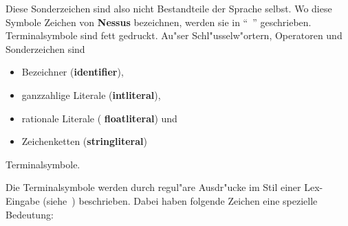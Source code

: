 Diese Sonderzeichen sind also nicht Bestandteile der Sprache selbst.
Wo diese Symbole Zeichen von {\bf Nessus} bezeichnen, werden sie in
``~'' geschrieben.  Terminalsymbole sind fett gedruckt. Au"ser
Schl"usselw"ortern, Operatoren und Sonderzeichen sind

\begin{itemize}
  
\item Bezeichner ({\bf identifier}),
  
\item ganzzahlige
Literale ({\bf intliteral}), 

  
\item rationale Literale ({\bf
floatliteral}) und

\item Zeichenketten ({\bf stringliteral})

\end{itemize}
Terminalsymbole. 

Die Terminalsymbole werden durch regul"are Ausdr"ucke
 im Stil einer Lex-Eingabe
(siehe~\cite{les75,sch85}) beschrieben. Dabei haben folgende Zeichen
eine spezielle Bedeutung:

